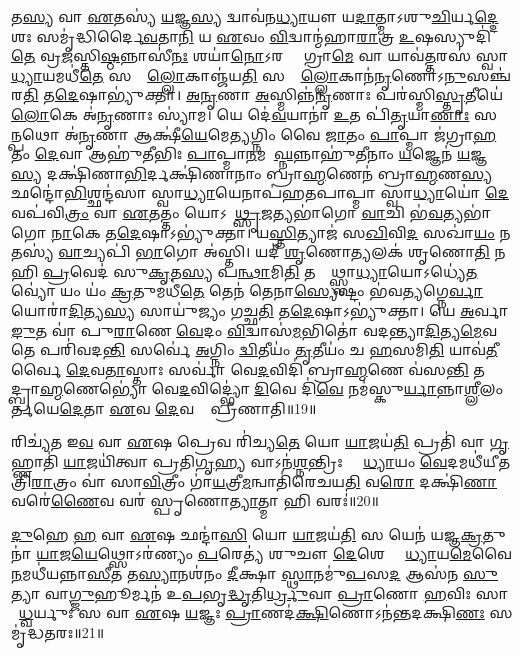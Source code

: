 𑌤\ul{𑌸𑍍𑌯} 𑌵𑌾 \ul{𑌏}𑌤𑌸𑍍𑌯॑ \ul{𑌯}𑌜𑍍𑌞\ul{𑌸𑍍𑌯} 𑌦𑍍𑌵𑌾𑌵॑𑌨\ul{𑌧𑍍𑌯𑌾}𑌯𑍗 𑌯\ul{𑌦𑌾}𑌤𑍍𑌮𑌾𑌽𑌶𑍁\ul{𑌚𑌿}𑌰𑍍𑌯\ul{𑌦𑍍𑌦𑍇}𑌶𑌃 𑌸𑌮𑍃॑𑌦𑍍𑌧𑌿𑌰𑍍𑌦𑍈\ul{𑌵}𑌤𑌾\ul{𑌨𑌿} 𑌯 \ul{𑌏}𑌵𑌂 \ul{𑌵𑌿}𑌦𑍍𑌵𑌾𑌨𑍍𑌮॑𑌹𑌾\ul{𑌰𑌾}𑌤𑍍𑌰 \ul{𑌉}𑌷𑌸𑍍𑌯𑍁𑌦𑌿॑\ul{𑌤𑍇} 𑌵𑍍𑌰\ul{𑌜}\ul{}𑌸𑍍𑌤𑌿\ul{𑌷𑍍𑌠}𑌨𑍍𑌨𑌾𑌸𑍀॑\ul{𑌨𑌃} 𑌶𑌯𑌾॑\ul{𑌨𑍋}𑌽𑌰𑌣𑍍𑌯𑍇᳚ 𑌗𑍍𑌰𑌾\ul{𑌮𑍇} 𑌵𑌾 𑌯𑌾𑌵॑\ul{𑌤𑍍𑌤}𑌰𑌸॑ 𑌸𑍍𑌵𑌾\ul{𑌧𑍍𑌯𑌾}𑌯𑌮𑌧𑍀॑\ul{𑌤𑍇} 𑌸𑌰𑍍𑌵𑌾𑌁᳚\ul{𑌲𑍍𑌲𑍋}𑌕𑌾𑌞𑍍𑌜॑𑌯\ul{𑌤𑌿} 𑌸𑌰𑍍𑌵𑌾𑌁᳚\ul{𑌲𑍍𑌲𑍋}𑌕𑌾𑌨॑\ul{𑌨𑍃}𑌣𑍋𑌽\ul{𑌨𑍁}\-𑌸𑌞𑍍𑌚॑𑌰\ul{𑌤𑌿} 𑌤\ul{𑌦𑍇}𑌷𑌾𑌭𑍍𑌯𑍁॑𑌕𑍍𑌤𑌾। 
\ul{𑌅}\ul{𑌨𑍃}𑌣𑌾 \ul{𑌅}𑌸𑍍𑌮𑌿𑌨𑍍𑌨॑\ul{𑌨𑍃}𑌣𑌾𑌃 𑌪𑌰॑𑌸𑍍𑌮𑌿\-\ul{𑌸𑍍𑌤𑍃}𑌤𑍀𑌯𑍇॑ \ul{𑌲𑍋}𑌕𑍇 𑌅॑\ul{𑌨𑍃}𑌣𑌾𑌃 𑌸𑍍𑌯𑌾॑𑌮। 
𑌯𑍇 𑌦𑍇॑\ul{𑌵}𑌯𑌾𑌨𑌾॑ \ul{𑌉}𑌤 𑌪𑌿॑\ul{𑌤𑍃}𑌯𑌾\ul{𑌣𑌾𑌃} 𑌸𑌰𑍍𑌵𑌾᳚\ul{𑌨𑍍𑌪}𑌥𑍋 𑌅॑\ul{𑌨𑍃}𑌣𑌾 𑌆𑌕𑍍𑌷𑍀॑\ul{𑌯𑍇}𑌮𑍇\ul{𑌤𑍍𑌯}𑌗𑍍𑌨𑌿𑌂 𑌵𑍈 \ul{𑌜𑌾}𑌤𑌂 \ul{𑌪𑌾}𑌪𑍍𑌮𑌾 𑌜॑𑌗𑍍𑌰𑌾\ul{𑌹} 𑌤𑌂 \ul{𑌦𑍇}𑌵𑌾 𑌆𑌹𑍁॑𑌤𑍀𑌭𑌿𑌃 \ul{𑌪𑌾}𑌪𑍍𑌮𑌾\ul{𑌨}𑌮𑌪𑌾᳚\ul{𑌘𑍍𑌨}𑌨𑍍𑌨𑌾𑌹𑍁॑𑌤𑍀𑌨𑌾𑌂 \ul{𑌯}𑌜𑍍𑌞𑍇𑌨॑ \ul{𑌯}𑌜𑍍𑌞\ul{𑌸𑍍𑌯} 𑌦𑌕𑍍𑌷𑌿॑𑌣𑌾\ul{𑌭𑌿}𑌰𑍍𑌦𑌕𑍍𑌷𑌿॑𑌣𑌾𑌨𑌾𑌂 𑌬𑍍𑌰𑌾\ul{𑌹𑍍𑌮}𑌣𑍇𑌨॑ 𑌬𑍍𑌰𑌾\ul{𑌹𑍍𑌮}𑌣\ul{𑌸𑍍𑌯} 𑌛𑌨𑍍𑌦𑍋॑\ul{𑌭𑌿}𑌶𑍍𑌛𑌨𑍍𑌦॑𑌸𑌾 𑌸𑍍𑌵𑌾\ul{𑌧𑍍𑌯𑌾}𑌯𑍇𑌨𑌾𑌪॑𑌹𑌤𑌪𑌾𑌪𑍍𑌮𑌾 𑌸𑍍𑌵𑌾\ul{𑌧𑍍𑌯𑌾}𑌯𑍋॑ \ul{𑌦𑍇}𑌵𑌪॑𑌵𑌿\ul{𑌤𑍍𑌰𑌂} 𑌵𑌾 \ul{𑌏}𑌤𑌤𑍍𑌤𑌂 𑌯𑍋𑌽𑌨𑍂᳚\ul{𑌥𑍍𑌸𑍃}𑌜𑌤𑍍𑌯𑌭𑌾॑𑌗𑍋 \ul{𑌵𑌾}𑌚𑌿 𑌭॑\ul{𑌵}𑌤𑍍𑌯𑌭𑌾॑𑌗𑍋 \ul{𑌨𑌾}𑌕𑍇 𑌤\ul{𑌦𑍇}𑌷𑌾𑌽𑌭𑍍𑌯𑍁॑𑌕𑍍𑌤𑌾। 
𑌯\ul{𑌸𑍍𑌤𑌿}𑌤𑍍𑌯𑌾𑌜॑ 𑌸\ul{𑌖𑌿}𑌵𑌿\ul{𑌦}\ul{} 𑌸𑌖𑌾॑\ul{𑌯𑌂} 𑌨 𑌤𑌸𑍍𑌯॑ \ul{𑌵𑌾}𑌚𑍍𑌯𑌪𑌿॑ \ul{𑌭𑌾}𑌗𑍋 𑌅॑𑌸𑍍𑌤𑌿। 
𑌯𑌦𑍀॑ \ul{𑌶𑍃}𑌣𑍋\ul{𑌤𑍍𑌯}𑌲𑌕॑ 𑌶𑍃𑌣𑍋\ul{𑌤𑌿} 𑌨 𑌹𑌿 \ul{𑌪𑍍𑌰}𑌵𑍇𑌦॑ 𑌸𑍁\ul{𑌕𑍃}𑌤\ul{𑌸𑍍𑌯} 𑌪\ul{𑌨𑍍𑌥𑌾}𑌮𑌿\ul{𑌤𑌿} 𑌤𑌸𑍍𑌮𑌾᳚𑌥𑍍𑌸𑍍𑌵𑌾\ul{𑌧𑍍𑌯𑌾}𑌯𑍋𑌽𑌧𑍍𑌯𑍇॑\ul{𑌤}𑌵𑍍𑌯𑍋॑ 𑌯𑌂 𑌯𑌂॑ \ul{𑌕𑍍𑌰}𑌤𑍁𑌮𑌧𑍀॑\ul{𑌤𑍇} 𑌤𑍇𑌨॑ 𑌤𑍇𑌨𑌾\ul{𑌸𑍍𑌯𑍇}𑌷𑍍𑌟𑌂 𑌭॑𑌵\ul{𑌤𑍍𑌯}𑌗𑍍𑌨𑍇\ul{𑌰𑍍𑌵𑌾}𑌯𑍋𑌰𑌾॑\ul{𑌦𑌿}𑌤𑍍𑌯\ul{𑌸𑍍𑌯} 𑌸𑌾𑌯𑍁॑𑌜𑍍𑌯𑌂 𑌗𑌚𑍍𑌛\ul{𑌤𑌿} 𑌤\ul{𑌦𑍇}𑌷𑌾𑌽𑌭𑍍𑌯𑍁॑𑌕𑍍𑌤𑌾। 
𑌯𑍇 \ul{𑌅}𑌰𑍍𑌵𑌾\ul{𑌙𑍁}𑌤 𑌵𑌾॑ 𑌪𑍁\ul{𑌰𑌾}𑌣𑍇 \ul{𑌵𑍇}𑌦𑌂 \ul{𑌵𑌿}𑌦𑍍𑌵𑌾𑌸॑\ul{𑌮}𑌭𑌿𑌤𑍋॑ 𑌵𑌦𑌨𑍍𑌤𑍍𑌯𑌾\ul{𑌦𑌿}𑌤𑍍𑌯\ul{𑌮𑍇}𑌵 𑌤𑍇 𑌪𑌰𑌿॑𑌵𑌦\ul{𑌨𑍍𑌤𑌿} 𑌸𑌰𑍍𑌵𑍇॑ \ul{𑌅}𑌗𑍍𑌨𑌿𑌂 \ul{𑌦𑍍𑌵𑌿}𑌤𑍀𑌯𑌂॑ \ul{𑌤𑍃}𑌤𑍀𑌯𑌂॑ 𑌚 \ul{𑌹}\ul{}𑌸𑌮𑌿\ul{𑌤𑌿} 𑌯𑌾𑌵॑\ul{𑌤𑍀}𑌰𑍍𑌵𑍈 \ul{𑌦𑍇}𑌵\ul{𑌤𑌾}𑌸𑍍𑌤𑌾𑌃 𑌸𑌰𑍍𑌵𑌾॑ 𑌵𑍇\ul{𑌦}𑌵𑌿𑌦𑌿॑ 𑌬𑍍𑌰𑌾\ul{𑌹𑍍𑌮}𑌣𑍇 𑌵॑𑌸\ul{𑌨𑍍𑌤𑌿} 𑌤𑌸𑍍𑌮𑌾᳚𑌦𑍍𑌬𑍍𑌰𑌾\ul{𑌹𑍍𑌮}𑌣𑍇𑌭𑍍𑌯𑍋॑ 𑌵𑍇\ul{𑌦}𑌵𑌿𑌦𑍍𑌭𑍍𑌯𑍋॑ \ul{𑌦𑌿}𑌵𑍇 𑌦𑌿॑\ul{𑌵𑍇} 𑌨𑌮॑𑌸𑍍𑌕𑍁\ul{𑌰𑍍𑌯𑌾}𑌨𑍍𑌨𑌾\ul{𑌶𑍍𑌲𑍀}𑌲𑌂 𑌕𑍀᳚𑌰𑍍𑌤𑌯𑍇\ul{𑌦𑍇}𑌤𑌾 \ul{𑌏}𑌵 \ul{𑌦𑍇}𑌵𑌤𑌾𑌃᳚ 𑌪𑍍𑌰𑍀𑌣𑌾𑌤𑌿॥19॥
\anuvakamend

𑌰𑌿𑌚𑍍𑌯॑𑌤 𑌇\ul{𑌵} 𑌵𑌾 \ul{𑌏}𑌷 𑌪𑍍𑌰𑍇𑌵 𑌰𑌿॑𑌚𑍍𑌯\ul{𑌤𑍇} 𑌯𑍋 \ul{𑌯𑌾}𑌜𑌯॑\ul{𑌤𑌿} 𑌪𑍍𑌰𑌤𑌿॑ 𑌵𑌾 \ul{𑌗𑍃}𑌹𑍍𑌣𑌾𑌤𑌿॑ \ul{𑌯𑌾}𑌜𑌯𑌿॑𑌤𑍍𑌵𑌾 𑌪𑍍𑌰𑌤𑌿\ul{𑌗𑍃}𑌹𑍍𑌯 𑌵𑌾𑌽𑌨॑\ul{𑌶𑍍𑌨}𑌨𑍍𑌤𑍍𑌰𑌿𑌃 𑌸𑍍𑌵𑌾᳚\ul{𑌧𑍍𑌯𑌾}𑌯𑌂 \ul{𑌵𑍇}𑌦𑌮𑌧𑍀॑𑌯𑍀𑌤 𑌤𑍍𑌰𑌿\ul{𑌰𑌾}𑌤𑍍𑌰𑌂 𑌵𑌾॑ 𑌸𑌾\ul{𑌵𑌿}𑌤𑍍𑌰𑍀𑌂 𑌗𑌾॑\ul{𑌯}𑌤𑍍𑌰𑍀\ul{𑌮}𑌨𑍍𑌵𑌾𑌤𑌿॑𑌰𑍇𑌚𑌯\ul{𑌤𑌿} 𑌵\ul{𑌰𑍋} 𑌦𑌕𑍍𑌷𑌿॑\ul{𑌣𑌾} 𑌵𑌰𑍇॑\ul{𑌣𑍈}𑌵 𑌵𑌰॑ 𑌸𑍍𑌪𑍃𑌣𑍋\ul{𑌤𑍍𑌯𑌾}𑌤𑍍𑌮𑌾 𑌹𑌿 𑌵𑌰𑌃॑॥20॥
\anuvakamend

\ul{𑌦𑍁}𑌹𑍇 \ul{𑌹} 𑌵𑌾 \ul{𑌏}𑌷 𑌛𑌨𑍍𑌦𑌾॑\ul{𑌸𑌿} 𑌯𑍋 \ul{𑌯𑌾}𑌜𑌯॑\ul{𑌤𑌿} 𑌸 𑌯𑍇𑌨॑ 𑌯𑌜𑍍𑌞\ul{𑌕𑍍𑌰}𑌤𑍁𑌨𑌾॑ \ul{𑌯𑌾}𑌜\ul{𑌯𑍇}𑌥𑍍𑌸𑍋𑌽𑌰॑𑌣𑍍𑌯𑌂 \ul{𑌪}𑌰𑍇𑌤𑍍𑌯॑ 𑌶𑍁𑌚𑍗 \ul{𑌦𑍇}𑌶𑍇 𑌸𑍍𑌵𑌾᳚\ul{𑌧𑍍𑌯𑌾}𑌯\ul{𑌮𑍇}𑌵𑍈\ul{𑌨}𑌮𑌧𑍀॑𑌯𑌨𑍍𑌨𑌾\ul{𑌸𑍀}𑌤 𑌤\ul{𑌸𑍍𑌯𑌾}𑌨𑌶॑𑌨𑌂 \ul{𑌦𑍀}𑌕𑍍𑌷𑌾 \ul{𑌸𑍍𑌥𑌾}𑌨𑌮𑍁॑\ul{𑌪}𑌸\ul{𑌦} 𑌆𑌸॑𑌨 \ul{𑌸𑍁}𑌤𑍍𑌯𑌾 𑌵𑌾\ul{𑌗𑍍𑌜𑍁}𑌹𑍂𑌰𑍍𑌮𑌨॑ 𑌉\ul{𑌪}𑌭𑍃\ul{𑌦𑍍𑌧𑍃}𑌤𑌿\ul{𑌰𑍍𑌧𑍍𑌰𑍁}𑌵𑌾 \ul{𑌪𑍍𑌰𑌾}𑌣𑍋 \ul{𑌹}𑌵𑌿𑌃 𑌸𑌾𑌮𑌾᳚\ul{𑌧𑍍𑌵}𑌰𑍍𑌯𑍁𑌃 𑌸 𑌵𑌾 \ul{𑌏}𑌷 \ul{𑌯}𑌜𑍍𑌞𑌃 \ul{𑌪𑍍𑌰𑌾}𑌣𑌦॑\ul{𑌕𑍍𑌷𑌿}𑌣𑍋𑌽𑌨॑𑌨𑍍𑌤\-𑌦𑌕𑍍𑌷𑌿\ul{𑌣𑌃} 𑌸𑌮𑍃॑𑌦𑍍𑌧𑌤𑌰𑌃॥21॥
\anuvakamend


